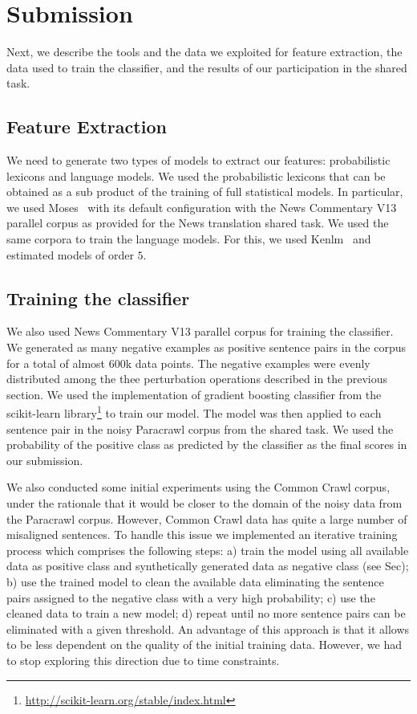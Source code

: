 \section{Submission}
\label{sec:results}

Next, we describe the tools and the data we exploited for feature extraction, the data used to train the classifier, and the results of our participation in the shared task.

\subsection{Feature Extraction}

We need to generate two types of models to extract our features: probabilistic lexicons and language models. We used the probabilistic lexicons that can be obtained as a sub product of the training of full statistical models. In particular, we used Moses~\cite{Moses} with its default configuration with the News Commentary V13 parallel corpus as provided for the News translation shared task. We used the same corpora to train the language models. For this, we used Kenlm~\cite{Kenlm} and estimated models of order $5$.


\subsection{Training the classifier}
\label{ssec:data}

We also used News Commentary V13 parallel corpus for training the classifier. We generated as many negative examples as positive sentence pairs in the corpus for a total of almost $600$k data points. The negative examples were evenly distributed among the thee perturbation operations described in the previous section. We used the implementation of gradient boosting classifier from the scikit-learn library\footnote{\url{http://scikit-learn.org/stable/index.html}} to train our model. The model was then applied to each sentence pair in the noisy Paracrawl corpus from the shared task. We used the probability of the positive class as predicted by the classifier as the final scores in our submission.

We also conducted some initial experiments using the Common Crawl corpus, under the rationale that it would be closer to the domain of the noisy data from the Paracrawl corpus. However, Common Crawl data has quite a large number of misaligned sentences. To handle this issue we implemented an iterative training process which comprises the following steps: a) train the model using all available data as positive class and synthetically generated data as negative class (see Sec); b) use the trained model to clean the available data eliminating the sentence pairs assigned to the negative class with a very high probability; c) use the cleaned data to train a new model; d) repeat until no more sentence pairs can be eliminated with a given threshold. An advantage of this approach is that it allows to be less dependent on the quality of the initial training data. However, we had to stop exploring this direction due to time constraints.


